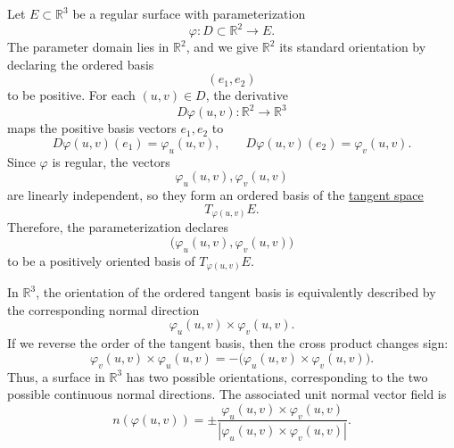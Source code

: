 	\begin{example}
	  \label{ex:orientation-of-surface-in-r3}
		Let $E \subset \mathbb{R}^3$ be a regular surface with parameterization
		\begin{equation}
			\varphi : D \subset \mathbb{R}^2 \to E.
		\end{equation}
		The parameter domain lies in $\mathbb{R}^2$, and we give $\mathbb{R}^2$ its standard orientation by declaring the ordered basis
		\begin{equation}
			(e_1,e_2)
		\end{equation}
		to be positive. For each $(u,v) \in D$, the derivative
		\begin{equation}
			D\varphi(u,v) : \mathbb{R}^2 \to \mathbb{R}^3
		\end{equation}
		maps the positive basis vectors $e_1,e_2$ to
		\begin{equation}
			D\varphi(u,v)(e_1) = \varphi_u(u,v),
			\qquad
			D\varphi(u,v)(e_2) = \varphi_v(u,v).
		\end{equation}
	Since $\varphi$ is regular, the vectors
	\begin{equation}
	\varphi_u(u,v), \varphi_v(u,v)
	\end{equation}
	are linearly independent, so they form an ordered basis of the \hyperref[def:tangent-space]{tangent space}
	\begin{equation}
	T_{\varphi(u,v)}E.
	\end{equation}
	Therefore, the parameterization declares
	\begin{equation}
	\bigl(\varphi_u(u,v),\varphi_v(u,v)\bigr)
	\end{equation}
	to be a positively oriented basis of $T_{\varphi(u,v)}E$.

	In $\mathbb{R}^3$, the orientation of the ordered tangent basis is equivalently described by the corresponding normal direction
	\begin{equation}
	\varphi_u(u,v) \times \varphi_v(u,v).
	\end{equation}
	If we reverse the order of the tangent basis, then the cross product changes sign:
	\begin{equation}
	\varphi_v(u,v) \times \varphi_u(u,v) = -\bigl(\varphi_u(u,v) \times \varphi_v(u,v)\bigr).
	\end{equation}
	Thus, a surface in $\mathbb{R}^3$ has two possible orientations, corresponding to the two possible continuous normal directions. The associated unit normal vector field is
	\begin{equation}
	n(\varphi(u,v)) = \pm \frac{\varphi_u(u,v)\times \varphi_v(u,v)}{|\varphi_u(u,v)\times \varphi_v(u,v)|}.
	\end{equation}


\end{example}
